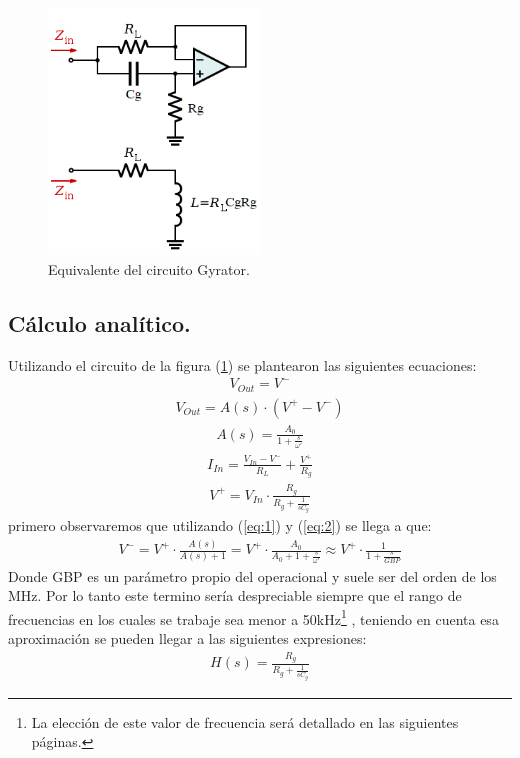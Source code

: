 \documentclass[a4paper]{article}
\begin{document}
\begin{figure}[H]	
	\centering
	\includegraphics[width=0.5\textwidth]{ImagenesEj2/gyrop.png}
	\caption{Equivalente del circuito Gyrator.}
	\label{fig:gyrop}
\end{figure}

\subsection{Cálculo analítico.}
Utilizando el circuito de la figura (\ref{fig:gyrop}) se plantearon las siguientes ecuaciones:
\begin{align}   V_{Out} = V^- \label{eq:1}\end{align}
\begin{align} V_{Out} = A(s) \cdot (V^+-V^-)\label{eq:2}\end{align}
\begin{align} A(s)= \frac{A_0}{1+\frac{s}{\omega'}}\end{align}
\begin{align} I_{In}=\frac{V_{In}-V^-}{R_L}+\frac{V^+}{R_g}\end{align}
\begin{align} V^+=V_{In}\cdot \frac{R_g}{R_g+\frac{1}{sC_g}} \end{align}
primero observaremos que utilizando (\ref{eq:1}) y (\ref{eq:2}) se llega a que:
\begin{align}V^- =V^+ \cdot \frac{A(s)}{A(s)+1} = V^+ \cdot \frac{A_0}{A_0+1+\frac{s}{\omega'}} \approx V^+ \cdot \frac{1}{1+\frac{s}{GBP}} \label{eq:desp}   \end{align}
Donde GBP es un parámetro propio del operacional y suele ser del orden de los MHz. Por lo tanto este termino sería despreciable siempre que el rango de frecuencias en los cuales se trabaje sea menor a 50kHz\footnote{La elección de este valor de frecuencia será detallado en las siguientes páginas.}
, teniendo en cuenta esa aproximación se pueden llegar a las siguientes expresiones:
\begin{align}H(s)= \frac{R_g}{R_g+\frac{1}{sC_g}} \end{align}
\end{document}
